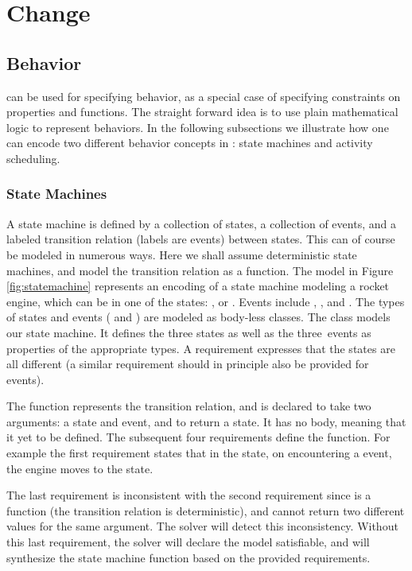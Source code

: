 \section{Change}
\label{sec:change}

\subsection{Behavior}

\Klang{} can be used for specifying behavior, as a special case of specifying constraints on properties and functions. The straight forward idea is to use plain mathematical logic to represent behaviors. In the following subsections we illustrate how one can encode two different behavior concepts in \Klang{}: state machines and activity scheduling.

\subsubsection{State Machines}

A state machine is defined by a collection of states,
a collection of events, and a labeled transition relation (labels are events) between states. This can of course be modeled in numerous ways. Here we shall assume deterministic state machines, and model the transition relation as a function. 
The \Klang{} model in Figure \ref{fig:statemachine} represents an encoding of a state machine modeling a rocket engine, which can be in one of the states:  ,  or . Events include , , and . The types of states and events ( and ) are modeled as body-less classes. The class 
models our state machine. It defines the three states as well as the three\
events as properties of the appropriate types. A requirement expresses that the
states are all different (a similar requirement should in principle also be provided for events).

The function  represents the transition relation, and 
is declared to take two arguments: a state and event, and to return a state. 
It has no body, meaning that it yet to be defined. The subsequent four  requirements define the 
\name{move} function. For example the first requirement states that
in the \name{off} state, on encountering a \name{turn\_on} event, the engine moves to the  state. 

The last requirement is inconsistent with the second requirement since 
is a function (the transition relation is deterministic), and cannot return two
different values for the same argument. The \Klang{} solver will detect this
inconsistency. Without this last requirement, the solver will declare the model satisfiable, and will synthesize the state machine function based on the provided requirements.


